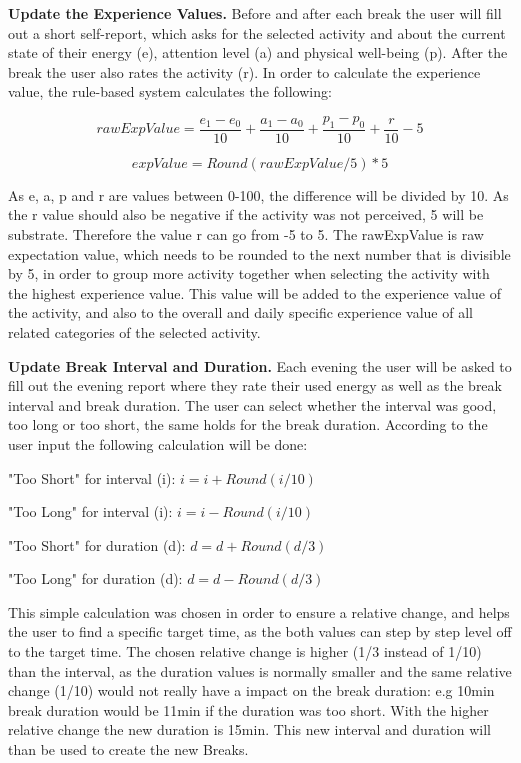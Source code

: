 \documentclass{hasel_thesis}
\begin{document}
\textbf{Update the Experience Values.} Before and after each break the user will fill out a short self-report, which asks for the selected activity and about the current state of their energy (e), attention level (a) and physical well-being (p). After the break the user also rates the activity (r). In order to calculate the experience value, the rule-based system calculates the following:

$$ rawExpValue = \frac{e_1- e_0}{10} + \frac{a_1- a_0}{10} + \frac{p_1-p_0}{10} + \frac{r}{10} -5$$

$$ expValue = Round(rawExpValue/5)*5$$

As e, a, p and r are values between 0-100, the difference will be divided by 10. As the r value should also be negative if the activity was not perceived, 5 will be substrate. Therefore the value r can go from -5 to 5. The rawExpValue is raw expectation value, which needs to be rounded to the next number that is divisible by 5, in order to group more activity together when selecting the activity with the highest experience value. This value will be added to the experience value of the activity, and also to the overall and daily specific experience value of all related categories of the selected activity.

\textbf{Update Break Interval and Duration.} Each evening the user will be asked to fill out the evening report where they rate their used energy as well as the break interval and break duration. The user can select whether the interval was good, too long or too short, the same holds for the break duration. According to the user input the following calculation will be done:

"Too Short" for interval (i): $ i = i + Round(i/10) $

"Too Long" for interval (i): $ i = i - Round(i/10) $

"Too Short" for duration (d): $ d = d + Round(d/3) $

"Too Long" for duration (d): $ d = d - Round(d/3) $

This simple calculation was chosen in order to ensure a relative change, and helps the user to find a specific target time, as the both values can step by step level off to the target time. The chosen relative change is higher (1/3 instead of 1/10)  than the interval, as the duration values is normally smaller and the same relative change (1/10) would not really have a impact on the break duration: e.g 10min break duration would be 11min if the duration was too short. With the higher relative change the new duration is 15min. This new interval and duration will than be used to create the new Breaks.
\end{document}
